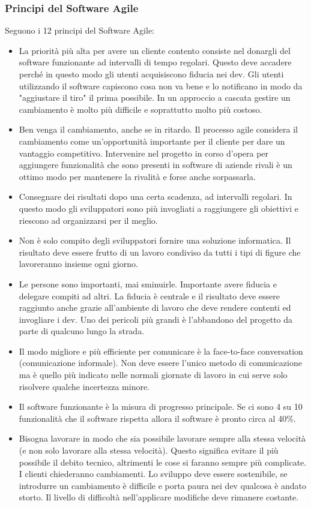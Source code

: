 \subsubsection{Principi del Software Agile}
Seguono i 12 principi del Software Agile:
\begin{itemize}
	\item La priorità più alta per avere un cliente contento consiste nel donargli del software funzionante ad intervalli di tempo regolari. Questo deve accadere perché in questo modo gli utenti acquisiscono fiducia nei dev. Gli utenti utilizzando il software capiscono cosa non va bene e lo notificano in modo da "aggiustare il tiro" il prima possibile. In un approccio a cascata gestire un cambiamento è molto più difficile e soprattutto molto più costoso.
	\item Ben venga il cambiamento, anche se in ritardo. Il processo agile considera il cambiamento come un'opportunità importante per il cliente per dare un vantaggio competitivo. Intervenire nel progetto in corso d'opera per aggiungere funzionalità che sono presenti in software di aziende rivali è un ottimo modo per mantenere la rivalità e forse anche sorpassarla.
	\item Consegnare dei risultati dopo una certa scadenza, ad intervalli regolari. In questo modo gli sviluppatori sono più invogliati a raggiungere gli obiettivi e riescono ad organizzarsi per il meglio.
	\item Non è solo compito degli sviluppatori fornire una soluzione informatica. Il risultato deve essere frutto di un lavoro condiviso da tutti i tipi di figure che lavoreranno insieme ogni giorno.
	\item Le persone sono importanti, mai sminuirle. Importante avere fiducia e delegare compiti ad altri. La fiducia è centrale e il risultato deve essere raggiunto anche grazie all'ambiente di lavoro che deve rendere contenti ed invogliare i dev. Uno dei pericoli più grandi è l'abbandono del progetto da parte di qualcuno lungo la strada.
	\item Il modo migliore e più efficiente per comunicare è la face-to-face conversation (comunicazione informale). Non deve essere l'unico metodo di comunicazione ma è quello più indicato nelle normali giornate di lavoro in cui serve solo risolvere qualche incertezza minore.
	\item Il software funzionante è la misura di progresso principale. Se ci sono 4 su 10 funzionalità che il software rispetta allora il software è pronto circa al 40\%.
	\item Bisogna lavorare in modo che sia possibile lavorare sempre alla stessa velocità (e non solo lavorare alla stessa velocità). Questo significa evitare il più possibile il debito tecnico, altrimenti le cose si faranno sempre più complicate. I clienti chiederanno cambiamenti. Lo sviluppo deve essere sostenibile, se introdurre un cambiamento è difficile e porta paura nei dev qualcosa è andato storto. Il livello di difficoltà nell'applicare modifiche deve rimanere costante.

\end{itemize}
